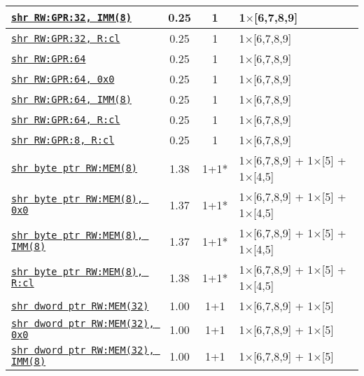 \documentclass[a4paper,english,fontsize=9]{scrartcl}
\begin{document}
\begin{longtable}{p{}ccL{.25\textwidth}}
  \midrule
  \texttt{\href{https://felixcloutier.com/x86/SAL:SAR:SHL:SHR.html}{shr RW:GPR:32, IMM(8)}} & 0.25 & 1 & 1\(\times\)[6,7,8,9] \\
  \midrule
  \texttt{\href{https://felixcloutier.com/x86/SAL:SAR:SHL:SHR.html}{shr RW:GPR:32, R:cl}} & 0.25 & 1 & 1\(\times\)[6,7,8,9] \\
  \midrule
  \texttt{\href{https://felixcloutier.com/x86/SAL:SAR:SHL:SHR.html}{shr RW:GPR:64}} & 0.25 & 1 & 1\(\times\)[6,7,8,9] \\
  \midrule
  \texttt{\href{https://felixcloutier.com/x86/SAL:SAR:SHL:SHR.html}{shr RW:GPR:64, 0x0}} & 0.25 & 1 & 1\(\times\)[6,7,8,9] \\
  \midrule
  \texttt{\href{https://felixcloutier.com/x86/SAL:SAR:SHL:SHR.html}{shr RW:GPR:64, IMM(8)}} & 0.25 & 1 & 1\(\times\)[6,7,8,9] \\
  \midrule
  \texttt{\href{https://felixcloutier.com/x86/SAL:SAR:SHL:SHR.html}{shr RW:GPR:64, R:cl}} & 0.25 & 1 & 1\(\times\)[6,7,8,9] \\
  \midrule
  \texttt{\href{https://felixcloutier.com/x86/SAL:SAR:SHL:SHR.html}{shr RW:GPR:8, R:cl}} & 0.25 & 1 & 1\(\times\)[6,7,8,9] \\
  \midrule
  \texttt{\href{https://felixcloutier.com/x86/SAL:SAR:SHL:SHR.html}{shr byte ptr RW:MEM(8)}} & 1.38 & 1+1* & 1\(\times\)[6,7,8,9] + 1\(\times\)[5] + 1\(\times\)[4,5] \\
  \midrule
  \texttt{\href{https://felixcloutier.com/x86/SAL:SAR:SHL:SHR.html}{shr byte ptr RW:MEM(8), 0x0}} & 1.37 & 1+1* & 1\(\times\)[6,7,8,9] + 1\(\times\)[5] + 1\(\times\)[4,5] \\
  \midrule
  \texttt{\href{https://felixcloutier.com/x86/SAL:SAR:SHL:SHR.html}{shr byte ptr RW:MEM(8), IMM(8)}} & 1.37 & 1+1* & 1\(\times\)[6,7,8,9] + 1\(\times\)[5] + 1\(\times\)[4,5] \\
  \midrule
  \texttt{\href{https://felixcloutier.com/x86/SAL:SAR:SHL:SHR.html}{shr byte ptr RW:MEM(8), R:cl}} & 1.38 & 1+1* & 1\(\times\)[6,7,8,9] + 1\(\times\)[5] + 1\(\times\)[4,5] \\
  \midrule
  \texttt{\href{https://felixcloutier.com/x86/SAL:SAR:SHL:SHR.html}{shr dword ptr RW:MEM(32)}} & 1.00 & 1+1 & 1\(\times\)[6,7,8,9] + 1\(\times\)[5] \\
  \midrule
  \texttt{\href{https://felixcloutier.com/x86/SAL:SAR:SHL:SHR.html}{shr dword ptr RW:MEM(32), 0x0}} & 1.00 & 1+1 & 1\(\times\)[6,7,8,9] + 1\(\times\)[5] \\
  \midrule
  \texttt{\href{https://felixcloutier.com/x86/SAL:SAR:SHL:SHR.html}{shr dword ptr RW:MEM(32), IMM(8)}} & 1.00 & 1+1 & 1\(\times\)[6,7,8,9] + 1\(\times\)[5] \\

\end{longtable}
\end{document}
